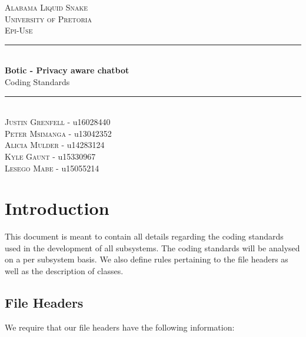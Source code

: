 \documentclass[11pt]{article}
\begin{document}
\renewcommand{\familydefault}{\sfdefault}
\begin{titlepage}
	\newcommand{\HRule}{\rule{\linewidth}{0.5mm}}
	\begin{center}
		            
		\textsc{\LARGE Alabama Liquid Snake}\\[0.8cm]
		\textsc{\Large University of Pretoria}\\[0.5cm]
		\textsc{\large Epi-Use}\\[0.5cm]
		    
		\HRule\\[0.4cm]
		    	
		{\huge\bfseries Botic - Privacy aware chatbot}\\[0.2cm]
		    	
		{\huge Coding Standards}\\[0.2cm]
		
		\HRule\\[0.5cm]
		
		\textsc{Justin Grenfell} - u16028440 \\[0cm]
		\textsc{Peter Msimanga} - u13042352 \\[0cm]
		\textsc{Alicia Mulder} - u14283124 \\[0cm]
		\textsc{Kyle Gaunt} - u15330967 \\[0cm]
		\textsc{Lesego Mabe} - u15055214 \\[0cm]
		    
	\end{center}
\end{titlepage}
\tableofcontents
\newpage
\section{Introduction}

This document is meant to contain all details regarding the coding standards used in the development of all subsystems. The coding standards will be analysed on a per subsystem basis. We also define rules pertaining to the file headers as well as the description of classes.

\subsection{File Headers}

We require that our file headers have the following information:
\end{document}
